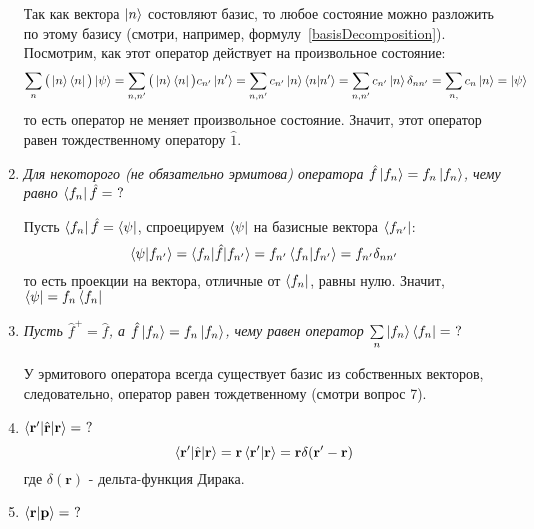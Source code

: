 \documentclass{article}
\begin{document}
\begin{enumerate}
	Так как вектора $\ket{n}$ состовляют базис, то любое состояние можно разложить по этому базису (смотри, например, формулу~\eqref{basisDecomposition}). Посмотрим, как этот оператор действует на произвольное состояние:
	\begin{equation}
		\sum\limits_n \big(\ket{n}\bra{n}\big) \ket{\psi} = \sum\limits_{n, n'} \big(\ket{n}\bra{n}\big) c_{n'}\ket{n'} = \sum\limits_{n, n'} c_{n'}\ket{n}\braket{n|n'} = \sum\limits_{n, n'} c_{n'}\ket{n}\delta_{nn'} = \sum\limits_{n,} c_{n}\ket{n} = \ket{\psi}
	\end{equation}
	то есть оператор не меняет произвольное состояние. Значит, этот оператор равен тождественному оператору $\hat{1}$.
	
	\item \textit{Для некоторого (не обязательно эрмитова) оператора $\hat{f}\ket{f_n} = f_n\ket{f_n}$, чему равно $\bra{f_n}\hat{f} = \ ?$}
	
	Пусть $\bra{f_n}\hat{f} = \bra{\psi}$, спроецируем $\bra{\psi}$ на базисные вектора $\bra{f_{n'}}$:
	\begin{equation}
		\braket{\psi|f_{n'}} = \braket{f_n|\hat{f}|f_{n'}} = f_{n'} \braket{f_n|f_{n'}} = f_{n'} \delta_{nn'}
	\end{equation}
	то есть проекции на вектора, отличные от $\bra{f_n}$, равны нулю. Значит, $\bra{\psi} = f_n\bra{f_n}$
	
	\item \textit{Пусть $\hat{f}^+=\hat{f}$, а $\hat{f}\ket{f_n} = f_n \ket{f_n}$, чему равен оператор $\sum\limits_n \ket{f_n}\bra{f_n} = \ ?$}
	
	У эрмитового оператора всегда существует базис из собственных векторов, следовательно, оператор равен тождетвенному (смотри вопрос 7).
	
	\item $\braket{\textbf{r}'|\hat{\textbf{r}}|\textbf{r}} = \ ?$
	\begin{equation}
		\braket{\textbf{r}'|\hat{\textbf{r}}|\textbf{r}} = \textbf{r} \braket{\textbf{r}'|\textbf{r}} =\textbf{r} \delta(\textbf{r}' - \textbf{r})
	\end{equation}
	где $\delta(\textbf{r})$ - дельта-функция Дирака.
	
	\item $\braket{\textbf{r}|\textbf{p}} = \ ?$
	

\end{enumerate}
\end{document}
